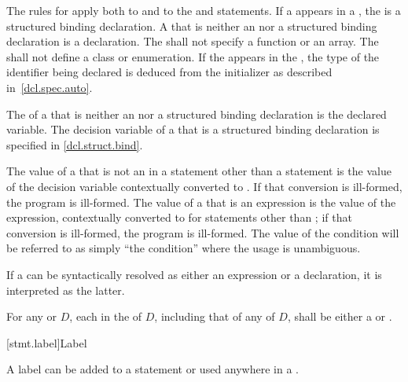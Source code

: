 \pnum
{}%
The rules for  apply both
to  and
to the  and  statements.
If a 
appears in a ,
the  is a structured binding declaration.
A  that is
neither an  nor a structured binding declaration
is a declaration.
The  shall not
specify a function or an array. The  shall not
define a class or enumeration. If the   appears in
the ,
the type of the identifier being declared is deduced from the initializer as described in~\ref{dcl.spec.auto}.

\pnum
The  of a 
that is neither an  nor a structured binding declaration
is the declared variable.
The decision variable of a 
that is a structured binding declaration is specified in \ref{dcl.struct.bind}.

\pnum
The value of a  that is not an 
in a statement other than a  statement is the value of the
decision variable
contextually converted to .
If that
conversion is ill-formed, the program is ill-formed.
The value of a
 that is an expression is the value of the
expression, contextually converted to 
for statements other
than ;
if that conversion is ill-formed, the program is
ill-formed. The value of the condition will be referred to as simply
``the condition'' where the usage is unambiguous.

\pnum
If a  can be syntactically resolved
as either an expression or a declaration,
it is interpreted as the latter.

\pnum
For any  or  $D$,
each 
in the  of $D$,
including that of any  of $D$,
shall be either a 
or .

[stmt.label]{Label}%

\pnum
{}%
%
A label can be added to a statement or
used anywhere in a .

